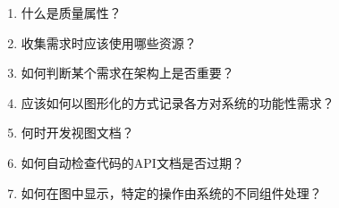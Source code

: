 \begin{enumerate}
\item
什么是质量属性？

\item
收集需求时应该使用哪些资源？

\item
如何判断某个需求在架构上是否重要？

\item
应该如何以图形化的方式记录各方对系统的功能性需求？

\item
何时开发视图文档？

\item
如何自动检查代码的API文档是否过期？

\item
如何在图中显示，特定的操作由系统的不同组件处理？

\end{enumerate}